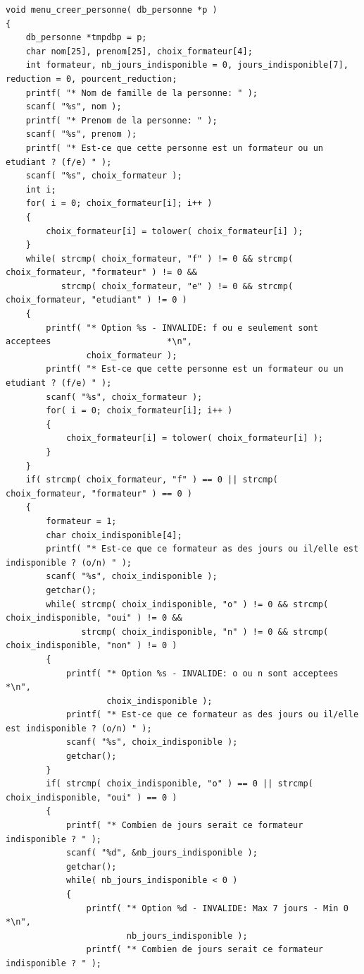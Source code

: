 \documentclass[11pt]{article}
\begin{document}
\begin{lstlisting}
void menu_creer_personne( db_personne *p )
{
    db_personne *tmpdbp = p;
    char nom[25], prenom[25], choix_formateur[4];
    int formateur, nb_jours_indisponible = 0, jours_indisponible[7], reduction = 0, pourcent_reduction;
    printf( "* Nom de famille de la personne: " );
    scanf( "%s", nom );
    printf( "* Prenom de la personne: " );
    scanf( "%s", prenom );
    printf( "* Est-ce que cette personne est un formateur ou un etudiant ? (f/e) " );
    scanf( "%s", choix_formateur );
    int i;
    for( i = 0; choix_formateur[i]; i++ )
    {
        choix_formateur[i] = tolower( choix_formateur[i] );
    }
    while( strcmp( choix_formateur, "f" ) != 0 && strcmp( choix_formateur, "formateur" ) != 0 &&
           strcmp( choix_formateur, "e" ) != 0 && strcmp( choix_formateur, "etudiant" ) != 0 )
    {
        printf( "* Option %s - INVALIDE: f ou e seulement sont acceptees                       *\n",
                choix_formateur );
        printf( "* Est-ce que cette personne est un formateur ou un etudiant ? (f/e) " );
        scanf( "%s", choix_formateur );
        for( i = 0; choix_formateur[i]; i++ )
        {
            choix_formateur[i] = tolower( choix_formateur[i] );
        }
    }
    if( strcmp( choix_formateur, "f" ) == 0 || strcmp( choix_formateur, "formateur" ) == 0 )
    {
        formateur = 1;
        char choix_indisponible[4];
        printf( "* Est-ce que ce formateur as des jours ou il/elle est indisponible ? (o/n) " );
        scanf( "%s", choix_indisponible );
        getchar();
        while( strcmp( choix_indisponible, "o" ) != 0 && strcmp( choix_indisponible, "oui" ) != 0 &&
               strcmp( choix_indisponible, "n" ) != 0 && strcmp( choix_indisponible, "non" ) != 0 )
        {
            printf( "* Option %s - INVALIDE: o ou n sont acceptees                                  *\n",
                    choix_indisponible );
            printf( "* Est-ce que ce formateur as des jours ou il/elle est indisponible ? (o/n) " );
            scanf( "%s", choix_indisponible );
            getchar();
        }
        if( strcmp( choix_indisponible, "o" ) == 0 || strcmp( choix_indisponible, "oui" ) == 0 )
        {
            printf( "* Combien de jours serait ce formateur indisponible ? " );
            scanf( "%d", &nb_jours_indisponible );
            getchar();
            while( nb_jours_indisponible < 0 )
            {
                printf( "* Option %d - INVALIDE: Max 7 jours - Min 0                                    *\n",
                        nb_jours_indisponible );
                printf( "* Combien de jours serait ce formateur indisponible ? " );

\end{lstlisting}
\end{document}
